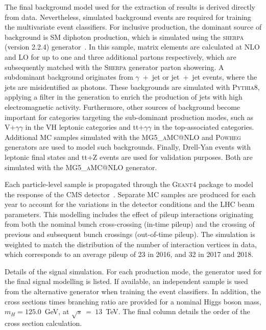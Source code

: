 The final background model used for the extraction of results is derived directly from data. Nevertheless, simulated background events are required for training the multivariate event classifiers. For inclusive production, the dominant source of background is SM diphoton production, which is simulated using the \textsc{sherpa} (version 2.2.4) generator~\cite{Gleisberg:2008ta}. In this sample, matrix elements are calculated at NLO and LO for up to one and three additional partons respectively, which are subsequently matched with the \textsc{Sherpa} generator parton showering. A subdominant background originates from $\gamma$~+~jet or jet~+~jet events, where the jets are misidentified as photons. These backgrounds are simulated with \textsc{Pythia8}, applying a filter in the generation to enrich the production of jets with high electromagnetic activity. Furthermore, other sources of background become important for categories targeting the sub-dominant production modes, such as V+$\gamma\gamma$ in the VH leptonic categories and tt+$\gamma\gamma$ in the top-associated categories. Additional MC samples simulated with the \textsc{MG5\_aMC@NLO} and \textsc{Powheg} generators are used to model such backgrounds. Finally, Drell-Yan events with leptonic final states and tt+Z events are used for validation purposes. Both are simulated with the \textsc{MG5\_aMC@NLO} generator.

Each particle-level sample is propagated through the \textsc{Geant4} package to model the response of the CMS detector~\cite{Agostinelli:2002hh}. Separate MC samples are produced for each year to account for the variations in the detector conditions and the LHC beam parameters. This modelling includes the effect of pileup interactions originating from both the nominal bunch cross-crossing (in-time pileup) and the crossing of previous and subsequent bunch crossings (out-of-time pileup). The simulation is weighted to match the distribution of the number of interaction vertices in data, which corresponds to an average pileup of 23 in 2016, and 32 in 2017 and 2018.

\begin{table}[htb]
    \caption[Signal simulation details]{Details of the signal simulation. For each production mode, the generator used for the final signal modelling is listed. If available, an independent sample is used from the alternative generator when training the event classifiers. In addition, the cross sections times branching ratio are provided for a nominal Higgs boson mass, $m_H=125.0$~GeV, at $\sqrt{s}~=~13$~TeV. The final column details the order of the cross section calculation.}
    \label{tab:signal_samples}
    \centering
    \scriptsize
    \hspace*{-5cm}
    \renewcommand{\arraystretch}{2}
    \setlength{\tabcolsep}{5pt}
    
    \hspace*{-5cm}
\end{table}



